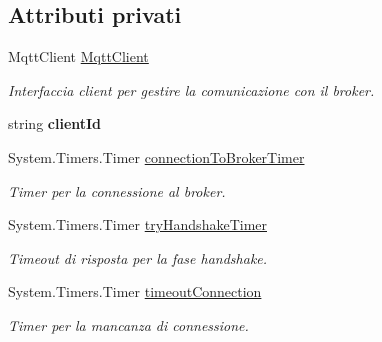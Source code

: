 \subsection*{Attributi privati}
\begin{DoxyCompactItemize}
\item 
\mbox{\label{classclient__app_1_1_main_window_a5bf5113d0b65e37a071f971870701555}} 
Mqtt\+Client \mbox{\hyperlink{classclient__app_1_1_main_window_a5bf5113d0b65e37a071f971870701555}{Mqtt\+Client}}
\begin{DoxyCompactList}\small\item\em Interfaccia client per gestire la comunicazione con il broker. \end{DoxyCompactList}\item 
\mbox{\label{classclient__app_1_1_main_window_acbb00036f865b3e1df49a1ca8194df63}} 
string {\bfseries client\+Id}
\item 
\mbox{\label{classclient__app_1_1_main_window_a9a1dcb37ef0934de257903c6f0596ce2}} 
System.\+Timers.\+Timer \mbox{\hyperlink{classclient__app_1_1_main_window_a9a1dcb37ef0934de257903c6f0596ce2}{connection\+To\+Broker\+Timer}}
\begin{DoxyCompactList}\small\item\em Timer per la connessione al broker. \end{DoxyCompactList}\item 
\mbox{\label{classclient__app_1_1_main_window_a3f18ece6505f93de4e612c576de136da}} 
System.\+Timers.\+Timer \mbox{\hyperlink{classclient__app_1_1_main_window_a3f18ece6505f93de4e612c576de136da}{try\+Handshake\+Timer}}
\begin{DoxyCompactList}\small\item\em Timeout di risposta per la fase handshake. \end{DoxyCompactList}\item 
\mbox{\label{classclient__app_1_1_main_window_aea05e8f1a08706b06e0eab8131d02fd7}} 
System.\+Timers.\+Timer \mbox{\hyperlink{classclient__app_1_1_main_window_aea05e8f1a08706b06e0eab8131d02fd7}{timeout\+Connection}}
\begin{DoxyCompactList}\small\item\em Timer per la mancanza di connessione. \end{DoxyCompactList}\item 

\end{DoxyCompactItemize}
